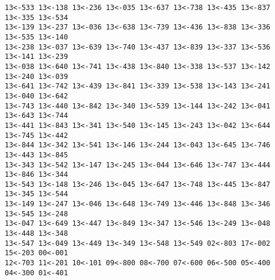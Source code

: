 \documentclass{concdistfoils}
\begin{document}
\begin{slide}
\begin{note}
\begin{verbatim}
13<-533 13<-138 13<-236 13<-035 13<-637 13<-738 13<-435 13<-837 13<-335 13<-534
13<-139 13<-237 13<-036 13<-638 13<-739 13<-436 13<-838 13<-336 13<-535 13<-140
13<-238 13<-037 13<-639 13<-740 13<-437 13<-839 13<-337 13<-536 13<-141 13<-239
13<-038 13<-640 13<-741 13<-438 13<-840 13<-338 13<-537 13<-142 13<-240 13<-039
13<-641 13<-742 13<-439 13<-841 13<-339 13<-538 13<-143 13<-241 13<-040 13<-642
13<-743 13<-440 13<-842 13<-340 13<-539 13<-144 13<-242 13<-041 13<-643 13<-744
13<-441 13<-843 13<-341 13<-540 13<-145 13<-243 13<-042 13<-644 13<-745 13<-442
13<-844 13<-342 13<-541 13<-146 13<-244 13<-043 13<-645 13<-746 13<-443 13<-845
13<-343 13<-542 13<-147 13<-245 13<-044 13<-646 13<-747 13<-444 13<-846 13<-344
13<-543 13<-148 13<-246 13<-045 13<-647 13<-748 13<-445 13<-847 13<-345 13<-544
13<-149 13<-247 13<-046 13<-648 13<-749 13<-446 13<-848 13<-346 13<-545 13<-248
13<-047 13<-649 13<-447 13<-849 13<-347 13<-546 13<-249 13<-048 13<-448 13<-348
13<-547 13<-049 13<-449 13<-349 13<-548 13<-549 02<-803 17<-002 15<-203 00<-001
12<-703 11<-201 10<-101 09<-800 08<-700 07<-600 06<-500 05<-400 04<-300 01<-401
\end{verbatim}
\end{note}
\end{slide}
\end{document}
